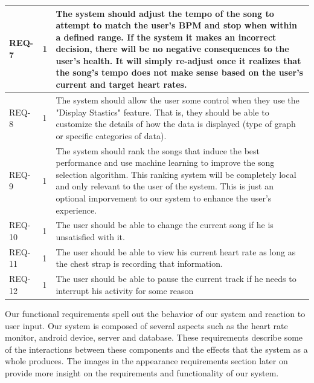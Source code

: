 \documentclass[letterpaper,english, 12pt]{scrreprt}
\begin{document}
\begin{center}
	\begin{tabular}{|C{2cm}|C{2cm}|C{8cm}|}
		\hline
			REQ-7 & 1 & The system should adjust the tempo of the song to attempt to match the user's BPM and stop when within a defined range. If the system it makes an incorrect decision, there will be no negative consequences to the user's health. It will simply re-adjust once it realizes that the song's tempo does not make sense based on the user's current and target heart rates.\\
		\hline
			REQ-8 & 1 & The system should allow the user some control when they use the "Display Stastics" feature. That is, they should be able to customize the details of how the data is displayed (type of graph or specific categories of data).\\
		\hline
			REQ-9 & 1 & The system should rank the songs that induce the best performance and use machine learning to improve the song selection algorithm. This ranking system will be completely local and only relevant to the user of the system. This is just an optional imporvement to our system to enhance the user's experience.\\
		\hline
                        REQ-10 & 1 & The user should be able to change the current song if he is unsatisfied with it. \\
                \hline
                        REQ-11 & 1 & The user should be able to view his current heart rate as long as the chest strap is recording that information. \\
		\hline
			REQ-12 & 1 & The user should be able to pause the current track if he needs to interrupt his activity for some reason \\
		\hline
	\end{tabular}
\end{center}

Our functional requirements spell out the behavior of our system and reaction to
user input. Our system is composed of several aspects such as the heart rate
monitor, android device, server and database. These requirements
describe some of the interactions between these components and the effects that
the system as a whole produces. The images in the appearance requirements section
later on provide more insight on the requirements and functionality of our system.
\end{document}
